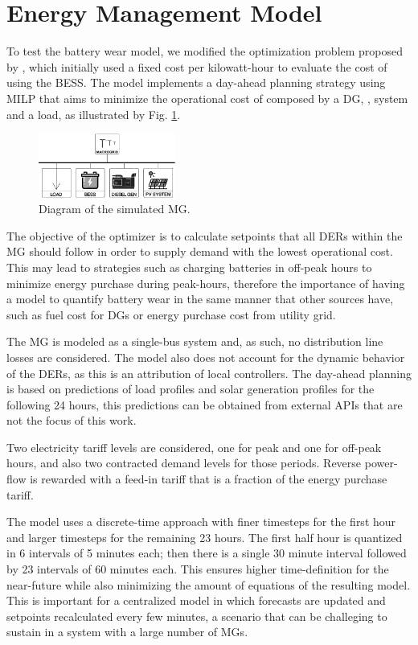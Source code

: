 \documentclass{ieeeaccess}
\begin{document}
    \section{Energy Management Model}
    To test the battery wear model, we modified the optimization problem proposed by \cite{SANTOS2018}, which initially used a fixed cost per kilowatt-hour to evaluate the cost of using the \ac{BESS}. The model implements a day-ahead planning strategy using \ac{MILP} that aims to minimize the operational cost of  composed by a \ac{DG}, ,  system and a load, as illustrated by Fig. \ref{fig:mg1}.
    \begin{figure}[htbp]
        \centering
        \includegraphics[width=0.4\textwidth]{figures/mg2.png}
        \caption{Diagram of the simulated \ac{MG}.}
        \label{fig:mg1}
    \end{figure}

    The objective of the optimizer is to calculate setpoints that all DERs within the \ac{MG} should follow in order to supply demand with the lowest operational cost. This may lead to strategies such as charging batteries in off-peak hours to minimize energy purchase during peak-hours, therefore the importance of having a model to quantify battery wear in the same manner that other sources have, such as fuel cost for \acp{DG} or energy purchase cost from utility grid.

    The \ac{MG} is modeled as a single-bus system and, as such, no distribution line losses are considered. The model also does not account for the dynamic behavior of the DERs, as this is an attribution of local controllers. The day-ahead planning is based on predictions of load profiles and solar generation profiles for the following 24 hours, this predictions can be obtained from external APIs that are not the focus of this work.

    Two electricity tariff levels are considered, one for peak and one for off-peak hours, and also two contracted demand levels for those periods. Reverse power-flow is rewarded with a feed-in tariff that is a fraction of the energy purchase tariff.

    The model uses a discrete-time approach with finer timesteps for the first hour and larger timesteps for the remaining 23 hours. The first half hour is quantized in 6 intervals of 5 minutes each; then there is a single 30 minute interval followed by 23 intervals of 60 minutes each. This ensures higher time-definition for the near-future while also minimizing the amount of equations of the resulting model. This is important for a centralized model in which forecasts are updated and setpoints recalculated every few minutes, a scenario that can be challeging to sustain in a system with a large number of \acp{MG}.
\end{document}

